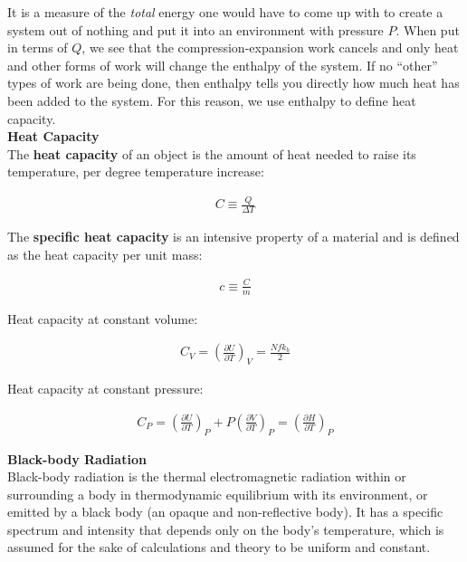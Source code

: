 \documentclass{article}
\begin{document}
It is a measure of the \textit{total} energy one would have to come up with to create a system out of nothing and put it into an environment with pressure $P$. When put in terms of $Q$, we see that the compression-expansion work cancels and only heat and other forms of work will change the enthalpy of the system. If no ``other'' types of work are being done, then enthalpy tells you directly how much heat has been added to the system. For this reason, we use enthalpy to define heat capacity.
\\

\noindent \textbf{Heat Capacity}\\
\indent The \textbf{heat capacity} of an object is the amount of heat needed to raise its temperature, per degree temperature increase:

\begin{gather*}
    C \equiv \frac{Q}{\Delta T}
\end{gather*}

\indent The \textbf{specific heat capacity} is an intensive property of a material and is defined as the heat capacity per unit mass:

\begin{gather*}
    c \equiv \frac{C}{m}
\end{gather*}

\indent Heat capacity at constant volume:

\begin{gather*}
    C_{V} = \left ( \frac{\partial U}{\partial T} \right )_{V} = \frac{Nfk_{b}}{2}
\end{gather*}

\indent Heat capacity at constant pressure:

\begin{gather*}
    C_{P} = \left ( \frac{\partial U}{\partial T}\right )_{P} + P\left ( \frac{\partial V}{\partial T}\right )_{P} = \left ( \frac{\partial H}{\partial T} \right )_{P}
\end{gather*}

\noindent \textbf{Black-body Radiation} \\
\indent Black-body radiation is the thermal electromagnetic radiation within or surrounding a body in thermodynamic equilibrium with its environment, or emitted by a black body (an opaque and non-reflective body). It has a specific spectrum and intensity that depends only on the body's temperature, which is assumed for the sake of calculations and theory to be uniform and constant.
\\
\end{document}
